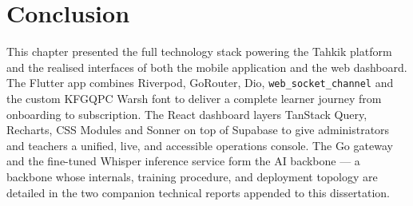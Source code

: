 \section{Conclusion}
This chapter presented the full technology stack powering the Tahkik platform and the realised interfaces of both the mobile application and the web dashboard. The Flutter app combines Riverpod, GoRouter, Dio, \texttt{web\_socket\_channel} and the custom KFGQPC Warsh font to deliver a complete learner journey from onboarding to subscription. The React dashboard layers TanStack Query, Recharts, CSS Modules and Sonner on top of Supabase to give administrators and teachers a unified, live, and accessible operations console. The Go gateway and the fine-tuned Whisper inference service form the AI backbone --- a backbone whose internals, training procedure, and deployment topology are detailed in the two companion technical reports appended to this dissertation.
